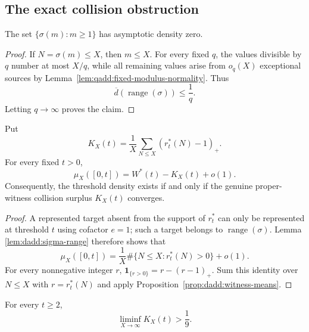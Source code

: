 \subsection{The exact collision obstruction}

\begin{lemma}
\label{lem:dadd:sigma-range}
The set $\{\sigma(m):m\geq1\}$ has asymptotic density zero.
\end{lemma}

\begin{proof}
If $N=\sigma(m)\leq X$, then $m\leq X$. For every fixed $q$,
the values divisible by $q$ number at most $X/q$, while all
remaining values arise from $o_q(X)$ exceptional sources by
Lemma~\ref{lem:qadd:fixed-modulus-normality}. Thus
\[
 \overline d(\operatorname{range}(\sigma))\leq\frac1q.
\]
Letting $q\to\infty$ proves the claim.
\end{proof}

\begin{proposition}
\label{prop:dadd:collision-criterion}
Put
\[
 K_X(t)=\frac1X\sum_{N\leq X}(r_t^*(N)-1)_+.
\]
For every fixed $t>0$,
\begin{equation}
\label{eq:dadd:collision-criterion}
 \mu_X([0,t])=W^*(t)-K_X(t)+o(1).
\end{equation}
Consequently, the threshold density exists if and only if the
genuine proper-witness collision surplus $K_X(t)$ converges.
\end{proposition}

\begin{proof}
A represented target absent from the support of $r_t^*$ can only
be represented at threshold $t$ using cofactor $e=1$; such a
target belongs to $\operatorname{range}(\sigma)$. Lemma
\ref{lem:dadd:sigma-range} therefore shows that
\[
 \mu_X([0,t])
 =\frac1X\#\{N\leq X:r_t^*(N)>0\}+o(1).
\]
For every nonnegative integer $r$,
$\boldsymbol1_{\{r>0\}}=r-(r-1)_+$. Sum this identity over
$N\leq X$ with $r=r_t^*(N)$ and apply
Proposition~\ref{prop:dadd:witness-means}.
\end{proof}

\begin{proposition}
\label{prop:dadd:collision-one-ninth}
For every $t\geq2$,
\begin{equation}
\label{eq:dadd:collision-one-ninth}
 \liminf_{X\to\infty}K_X(t)>\frac19.
\end{equation}
\end{proposition}

